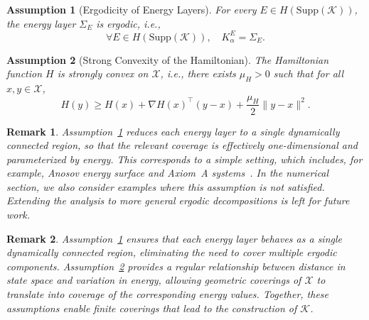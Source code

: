 \documentclass[letterpaper, 10 pt, conference]{ieeeconf}
\newtheorem{assumption}{Assumption}
\newtheorem{remark}{Remark}
\newcommand{\Supp}{\mathrm{Supp}}
\begin{document}
\begin{assumption}[Ergodicity of Energy Layers]
\label{ass_dim_ergodic_components}
For every $E \in H(\Supp(\mathcal{K}))$, the energy layer $\Sigma_E$ is ergodic, i.e.,
\[
\forall E \in H(\Supp(\mathcal{K})),\quad K_\alpha^E = \Sigma_E.
\]
\end{assumption}

\begin{assumption}[Strong Convexity of the Hamiltonian]
\label{ass_strong_convexity}
The Hamiltonian function $H$ is strongly convex on $\mathcal{X}$, i.e., there exists $\mu_H>0$ such that for all $x,y\in\mathcal{X}$,
\[
H(y)\ge H(x)+\nabla H(x)^\top (y-x)+\frac{\mu_H}{2}\|y-x\|^2.
\]
\end{assumption}

\begin{remark}
Assumption~\ref{ass_dim_ergodic_components} reduces each energy layer to a single dynamically connected region, so that the relevant coverage is effectively one-dimensional and parameterized by energy. This corresponds to a simple setting, which includes, for example, Anosov energy surface and Axiom~A systems~\cite{plante1972anosov, hopf1971ergodic,bowen1975ergodic}. In the numerical section, we also consider examples where this assumption is not satisfied. Extending the analysis to more general ergodic decompositions is left for future work.
\end{remark}

\begin{remark}
\label{rem:Strong_Convexity}
Assumption~\ref{ass_dim_ergodic_components} ensures that each energy layer behaves as a single dynamically connected region, eliminating the need to cover multiple ergodic components. Assumption~\ref{ass_strong_convexity} provides a regular relationship between distance in state space and variation in energy, allowing geometric coverings of $\mathcal{X}$ to translate into coverage of the corresponding energy values. Together, these assumptions enable finite coverings that lead to the construction of $\mathcal{K}$.
\end{remark}
\end{document}
